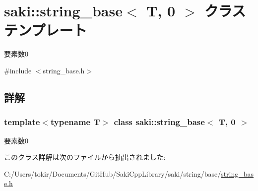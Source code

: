 \hypertarget{classsaki_1_1string__base_3_01_t_00_010_01_4}{}\section{saki\+:\+:string\+\_\+base$<$ T, 0 $>$ クラステンプレート}
\label{classsaki_1_1string__base_3_01_t_00_010_01_4}


要素数0  




{\ttfamily \#include $<$string\+\_\+base.\+h$>$}



\subsection{詳解}
\subsubsection*{template$<$typename T$>$\newline
class saki\+::string\+\_\+base$<$ T, 0 $>$}

要素数0 

このクラス詳解は次のファイルから抽出されました\+:\begin{DoxyCompactItemize}
\item 
C\+:/\+Users/tokir/\+Documents/\+Git\+Hub/\+Saki\+Cpp\+Library/saki/string/base/\mbox{\hyperlink{string__base_8h}{string\+\_\+base.\+h}}\end{DoxyCompactItemize}
